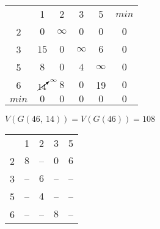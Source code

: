 \begin{table}[H]
\begin{center}
	\def\tabcolsep{18pt}
	\def\arraystretch{1.5}
	\fontsize{13}{14}\selectfont
	\begin{tabular}{|c||c|c|c|c||c|}
		\hline 
	  	& 1 & 2 & 3 & 5 & $min$\\ 
		\hhline{|=#=|=|=|=#=|} 
		2 & $0$ & $\infty$ & $0$ & $0$ & $0$ \\ 
		\hline 
		3 & $15$ & $0$ & $\infty$ & $6$ & $0$ \\ 
		\hline 
		5 & $8$ & $0$ & $4$ & $\infty$ & $0$ \\ 
		\hline 
		6 & $\cancelto{\infty}{14}$ & $8$ & $0$ & 19 & $0$ \\
		\hhline{|=#=|=|=|=#=|}
		$min$ & $0$ & $0$ & $0$ & $0$ & $0$ \\
		\hline
	\end{tabular}  
\end{center}
\end{table}

\noindent $V(G(46,\ 14)) = V(G(46)) = 108$

\begin{table}[H]
\begin{center}
	\def\tabcolsep{18pt}
	\def\arraystretch{1.5}
	\fontsize{13}{14}\selectfont
	\begin{tabular}{|c||c|c|c|c|}
		\hline 
	  	& 1 & 2 & 3 & 5 \\ 
		\hhline{|=#=|=|=|=|} 
		2 & \cellcolor{pink} $8$ & -- & $0$ & $6$ \\ 
		\hline 
		3 & -- & $6$ & -- & -- \\ 
		\hline 
		5 & -- & $4$ & -- & -- \\ 
		\hline 
		6 & -- & -- & \cellcolor{pink} $8$ & -- \\
		\hline
	\end{tabular}  
\end{center}
\end{table}

